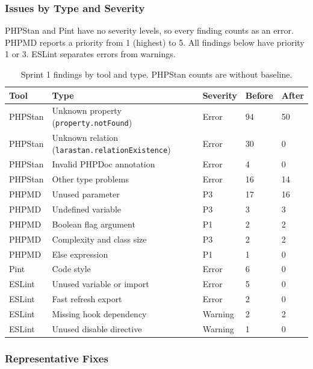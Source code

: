 \subsubsection*{Issues by Type and Severity}

PHPStan and Pint have no severity levels, so every finding counts as an error.
PHPMD reports a priority from 1 (highest) to 5.
All findings below have priority 1 or 3.
ESLint separates errors from warnings.

\begin{table}[H]
  \centering
  \begin{tabularx}{\linewidth}{L{2.4cm}YL{1.6cm}L{1.4cm}L{1.4cm}}
    \toprule
    Tool & Type & Severity & Before & After \\
    \midrule
    PHPStan & Unknown property (\texttt{property.notFound}) & Error & 94 & 50 \\
    PHPStan & Unknown relation (\texttt{larastan.relationExistence}) & Error & 30 & 0 \\
    PHPStan & Invalid PHPDoc annotation & Error & 4 & 0 \\
    PHPStan & Other type problems & Error & 16 & 14 \\
    PHPMD & Unused parameter & P3 & 17 & 16 \\
    PHPMD & Undefined variable & P3 & 3 & 3 \\
    PHPMD & Boolean flag argument & P1 & 2 & 2 \\
    PHPMD & Complexity and class size & P3 & 2 & 2 \\
    PHPMD & Else expression & P1 & 1 & 0 \\
    Pint & Code style & Error & 6 & 0 \\
    ESLint & Unused variable or import & Error & 5 & 0 \\
    ESLint & Fast refresh export & Error & 2 & 0 \\
    ESLint & Missing hook dependency & Warning & 2 & 2 \\
    ESLint & Unused disable directive & Warning & 1 & 0 \\
    \bottomrule
  \end{tabularx}
  \caption{Sprint 1 findings by tool and type. PHPStan counts are without baseline.}
  \label{tab:static-sprint1-types}
\end{table}

\subsubsection*{Representative Fixes}


